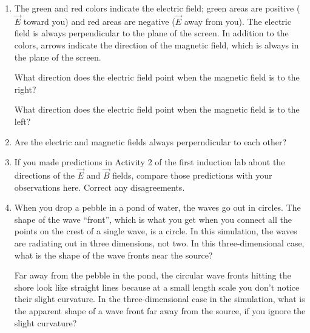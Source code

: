 \begin{enumerate}
\item The green and red colors indicate the electric field; green areas are positive 
($\vec E$ toward you) and red areas are negative ($\vec E$ away from you). 
The electric field is always perpendicular to the plane of the screen.
In addition to the colors, arrows indicate the 
direction of the magnetic field, which is always in the plane of the screen.  

What direction does the electric field point when the magnetic field is to the right?
\vspace{1cm}

What direction does the electric field point when the magnetic field is to the left?
\vspace{1cm}

\item Are the electric and magnetic fields always perperndicular to each other?
\vspace{1.0cm}


\item If you made predictions in Activity 2 of the first induction lab about the directions of the $\vec E$ 
and $\vec B$ fields, compare those predictions with your observations here. Correct any disagreements.
\vspace{2.0cm}

\item When you drop a pebble in a pond of water, the waves go out in circles. The shape of the wave ``front'', which is what you get when you connect all the points on the crest of a single wave, is a circle.   In this simulation, the waves are radiating out in three dimensions, not two.  In this three-dimensional case, what is the shape of the wave fronts near the source?
\vspace{1cm}

Far away from the pebble in the pond, the circular wave fronts hitting the shore look like straight lines because at a small length scale you don't notice their slight curvature. In the three-dimensional case in the simulation, what is the apparent shape of a wave front far away from the source, if you ignore the slight curvature?
\vspace{1cm}



\end{enumerate}
